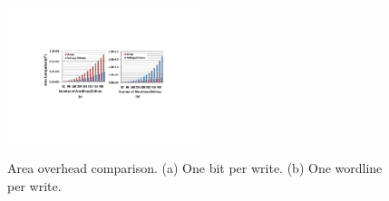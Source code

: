 \begin{figure}%
\centering
  \includegraphics[width=0.5\textwidth]{./figures/area_comp_f1.pdf}\\
  \caption{Area overhead comparison. (a) One bit per write. (b) One wordline per write.}\label{fig:area_i}
\vspace{-10pt}
\end{figure}

%
%


